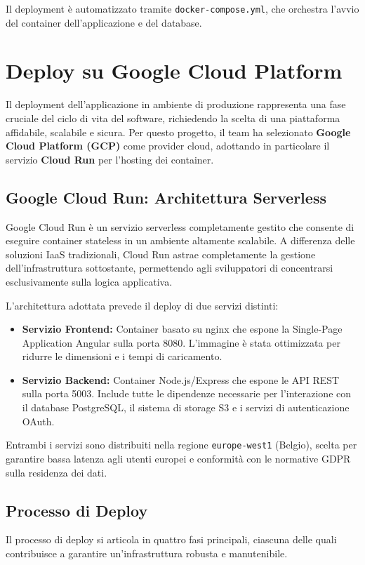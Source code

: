 Il deployment è automatizzato tramite \texttt{docker-compose.yml}, che orchestra l'avvio del container dell'applicazione e del database.

\section{Deploy su Google Cloud Platform}
Il deployment dell'applicazione in ambiente di produzione rappresenta una fase cruciale del ciclo di vita del software, richiedendo la scelta di una piattaforma affidabile, scalabile e sicura. Per questo progetto, il team ha selezionato \textbf{Google Cloud Platform (GCP)} come provider cloud, adottando in particolare il servizio \textbf{Cloud Run} per l'hosting dei container.

\subsection{Google Cloud Run: Architettura Serverless}
Google Cloud Run è un servizio serverless completamente gestito che consente di eseguire container stateless in un ambiente altamente scalabile. A differenza delle soluzioni IaaS tradizionali, Cloud Run astrae completamente la gestione dell'infrastruttura sottostante, permettendo agli sviluppatori di concentrarsi esclusivamente sulla logica applicativa.

L'architettura adottata prevede il deploy di due servizi distinti:
\begin{itemize}
    \item \textbf{Servizio Frontend:} Container basato su nginx che espone la Single-Page Application Angular sulla porta 8080. L'immagine è stata ottimizzata per ridurre le dimensioni e i tempi di caricamento.
    
    \item \textbf{Servizio Backend:} Container Node.js/Express che espone le API REST sulla porta 5003. Include tutte le dipendenze necessarie per l'interazione con il database PostgreSQL, il sistema di storage S3 e i servizi di autenticazione OAuth.
\end{itemize}

Entrambi i servizi sono distribuiti nella regione \texttt{europe-west1} (Belgio), scelta per garantire bassa latenza agli utenti europei e conformità con le normative GDPR sulla residenza dei dati.

\subsection{Processo di Deploy}
Il processo di deploy si articola in quattro fasi principali, ciascuna delle quali contribuisce a garantire un'infrastruttura robusta e manutenibile.

